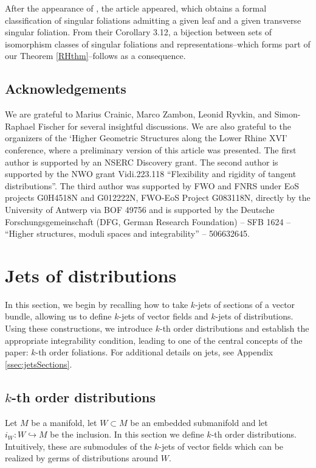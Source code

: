 \documentclass[10pt]{amsart}
\numberwithin{theoremalpha}{section}
\numberwithin{equation}{section}
\numberwithin{definition}{section}
\numberwithin{theorem}{section}
\numberwithin{proposition}{section}
\numberwithin{lemma}{section}
\numberwithin{example}{section}
\numberwithin{remark}{section}
\numberwithin{corollary}{section}
\numberwithin{question}{section}
\numberwithin{problem}{section}
\numberwithin{assumption}{section}
\theoremstyle{named}
\numberwithin{equation}{section}
\begin{document}
After the appearance of \cite{BPW23}, the article \cite{fischer2024classification} appeared, which obtains a formal classification of singular foliations admitting a given leaf and a given transverse singular foliation. From their Corollary 3.12, a bijection between sets of isomorphism classes of singular foliations and representations--which forms part of our Theorem \ref{RHthm}--follows as a consequence. 

\subsection*{Acknowledgements}

We are grateful to Marius Crainic, Marco Zambon, Leonid Ryvkin, and Simon-Raphael Fischer for several insightful discussions. We are also grateful to the organizers of the `Higher Geometric Structures along the Lower Rhine XVI' conference, where a preliminary version of this article was presented. The first author is supported by an NSERC Discovery grant. The second author is supported by the NWO grant Vidi.223.118 ``Flexibility and rigidity of tangent distributions''. The third author was supported by FWO and FNRS under EoS projects G0H4518N and G012222N, FWO-EoS Project G083118N, directly by the University of Antwerp via BOF 49756 and is supported by the Deutsche Forschungsgemeinschaft (DFG, German Research Foundation) -- SFB 1624 -- ``Higher structures, moduli spaces and integrability'' -- 506632645. 




\section{Jets of distributions}\label{sec:jets}

In this section, we begin by recalling how to take $k$-jets of sections of a vector bundle, allowing us to define $k$-jets of vector fields and $k$-jets of distributions. Using these constructions, we introduce $k$-th order distributions and establish the appropriate integrability condition, leading to one of the central concepts of the paper: $k$-th order foliations. For additional details on jets, see Appendix \ref{ssec:jetsSections}.

\subsection{$k$-th order distributions}
Let $M$ be a manifold, let $W \subset M$ be an embedded submanifold and let $i_{W}: W \hookrightarrow M$ be the inclusion. In this section we define $k$-th order distributions. Intuitively, these are submodules of the $k$-jets of vector fields which can be realized by germs of distributions around $W$. 
\end{document}
